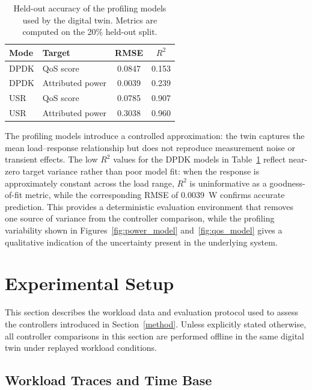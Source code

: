 \documentclass[a4paper,fleqn]{cas-sc}
\begin{document}
\begin{table}[width=.9\linewidth,cols=4,pos=h]
\centering
\caption{Held-out accuracy of the profiling models used by the digital twin. Metrics are computed on the 20\% held-out split.}
\label{tab:profiling_acc}
\begin{tabular}{l l c c}
\hline
Mode & Target & RMSE & $R^2$ \\
\hline
DPDK & QoS score        & 0.0847 & 0.153 \\
DPDK & Attributed power & 0.0039 & 0.239 \\
USR  & QoS score        & 0.0785 & 0.907 \\
USR  & Attributed power & 0.3038 & 0.960 \\
\hline
\end{tabular}
\end{table}

The profiling models introduce a controlled approximation: the twin captures the mean load--response relationship but does not reproduce measurement noise or transient effects. The low $R^2$ values for the DPDK models in Table~\ref{tab:profiling_acc} reflect near-zero target variance rather than poor model fit: when the response is approximately constant across the load range, $R^2$ is uninformative as a goodness-of-fit metric, while the corresponding RMSE of 0.0039~W confirms accurate prediction. This provides a deterministic evaluation environment that removes one source of variance from the controller comparison, while the profiling variability shown in Figures~\ref{fig:power_model} and~\ref{fig:qos_model} gives a qualitative indication of the uncertainty present in the underlying system.

\section{Experimental Setup}
\label{testbed}

This section describes the workload data and evaluation protocol used to assess the controllers introduced in Section~\ref{method}. Unless explicitly stated otherwise, all controller comparisons in this section are performed offline in the same digital twin under replayed workload conditions.

\subsection{Workload Traces and Time Base}
\label{subsec:workload}
\end{document}
